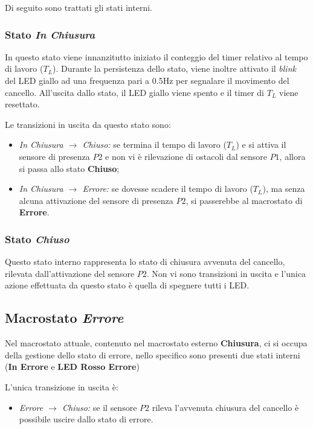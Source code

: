    \noindent Di seguito sono trattati gli stati interni.

    \subsubsection{Stato \textit{In Chiusura}}
    In questo stato viene innanzitutto iniziato il conteggio del timer relativo al tempo di lavoro ($T_L$).
    Durante la persistenza dello stato, viene inoltre attivato il \textit{blink} del LED giallo ad una frequenza pari a 0.5Hz per segnalare il movimento del cancello. All'uscita dallo stato, il LED giallo viene spento e il timer di $T_L$ viene resettato.
    
    \noindent Le transizioni in uscita da questo stato sono:
    \begin{itemize}
        \item \textit{In Chiusura $\rightarrow$ Chiuso:} se termina il tempo di lavoro ($T_L$) e si attiva il sensore di presenza $P2$ e non vi è rilevazione di ostacoli dal sensore $P1$, allora si passa allo stato \textbf{Chiuso};
        
        \item \textit{In Chiusura $\rightarrow$ Errore:} se dovesse scadere il tempo di lavoro ($T_L$), ma senza alcuna attivazione del sensore di presenza $P2$, si passerebbe al macrostato di \textbf{Errore}.
    \end{itemize}

    \subsubsection{Stato \textit{Chiuso}}
    Questo stato interno rappresenta lo stato di chiusura avvenuta del cancello, rilevata dall'attivazione del sensore $P2$.
    Non vi sono transizioni in uscita e l'unica azione effettuata da questo stato è quella di spegnere tutti i LED.


\subsection{Macrostato \textit{Errore}} \label{macrostato-errore}
    Nel macrostato attuale, contenuto nel macrostato esterno \textbf{Chiusura}, ci si occupa della gestione dello stato di errore, nello specifico sono presenti due stati interni (\textbf{In Errore} e \textbf{LED Rosso Errore}) 

    \noindent L'unica transizione in uscita è:
    \begin{itemize}
        \item \textit{Errore $\rightarrow$ Chiuso:} se il sensore $P2$ rileva l'avvenuta chiusura del cancello è possibile uscire dallo stato di errore.
    \end{itemize}
    
